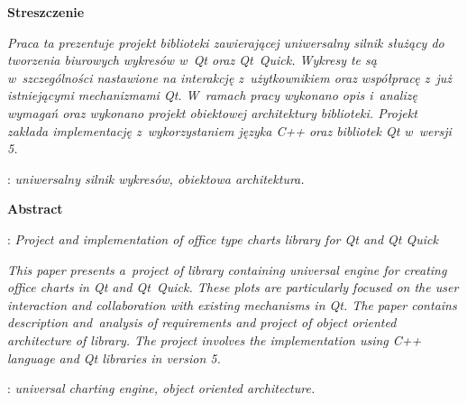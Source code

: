 \begin{titlepage}
    \newpage\thispagestyle{empty}
    \vspace*{2\baselineskip}
    \begin{center}
	{\large\bfseries Streszczenie}\par\bigskip
    \end{center}

    {\itshape
    Praca ta prezentuje projekt biblioteki zawierającej uniwersalny silnik służący do tworzenia  biurowych wykresów w~Qt oraz Qt~Quick. Wykresy te są w~szczególności nastawione na interakcję z~użytkownikiem oraz współpracę z~już istniejącymi mechanizmami Qt.
	W~ramach pracy wykonano opis i~analizę wymagań oraz wykonano projekt obiektowej architektury biblioteki. Projekt zakłada implementację z~wykorzystaniem języka C++ oraz bibliotek Qt w~wersji 5.
	}
    \vspace*{1\baselineskip}

    : {\itshape uniwersalny silnik wykresów, obiektowa architektura.}
    \par
    \vspace{4\baselineskip}
    \begin{center}
	{\large\bfseries Abstract}\par\bigskip
    \end{center}
    : {\itshape Project and implementation of office type charts library for Qt and Qt Quick}\par
    \vspace*{1\baselineskip}
    {\itshape
    This paper presents a~project of library containing universal engine for creating office charts in Qt and Qt~Quick. These plots are particularly focused on the user interaction and collaboration with existing mechanisms in Qt.
The paper contains description and~analysis of requirements and project of object ​​oriented architecture of library. The project involves the implementation using C++ language and Qt libraries in version 5.}
    \vspace*{1\baselineskip}

    : {\itshape universal charting engine, object oriented architecture.}

\end{titlepage}

